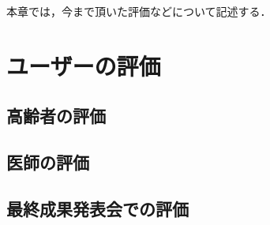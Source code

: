 \documentclass[../report]{subfiles}
\begin{document}
本章では，今まで頂いた評価などについて記述する．


\section{ユーザーの評価}
\subsection{高齢者の評価}

\subsection{医師の評価}

\subsection{最終成果発表会での評価}
\end{document}
